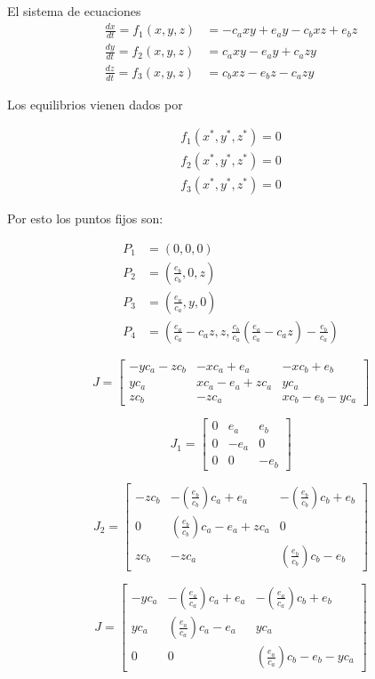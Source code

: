 \documentclass[twocolumn,aps,prl]{revtex4-1}
\begin{document}
El sistema de ecuaciones
$$
\begin{aligned}
\frac{d x}{d t} = f_1(x, y, z) &=-c_{a} x y+e_{a} y-c_{b} x z+e_{b} z \\
\frac{d y}{d t} = f_2(x, y, z) &=c_{a} x y-e_{a} y+c_{a} z y          \\
\frac{d z}{d t} = f_3(x, y, z) &=c_{b} x z-e_{b} z-c_{a} z y            
\end{aligned}
$$

Los equilibrios vienen dados por 

$$
\begin{aligned}
    f_1(x^*, y^*, z^*) = 0\\ 
    f_2(x^*, y^*, z^*) = 0\\ 
    f_3(x^*, y^*, z^*) = 0   
\end{aligned}
$$

Por esto los puntos fijos son:

$$
\begin{aligned}
    P_1 &= (0, 0, 0) \\ 
    P_2 &= (\frac{e_b}{c_b}, 0, z) \\ 
    P_3 &= (\frac{e_a}{c_a}, y, 0) \\ 
    P_4 &= (\frac{e_a}{c_a} - c_a z, z, \frac{c_b}{c_a} (\frac{e_a}{c_a} - c_a z) - \frac{e_b}{c_a}) 
\end{aligned}
$$


$$
J = 
\begin{bmatrix}  
    - y c_a - z c_b & - x c_a + e_a & - x c_b + e_b \\
    y c_a & x c_a - e_a + z c_a & y c_a \\
    z c_b & - z c_a & x c_b - e_b - y c_a 
\end{bmatrix}
$$

$$
J_1 = 
\begin{bmatrix}
    0 & e_a & e_b \\
    0 & - e_a & 0 \\
    0 & 0 & - e_b 
\end{bmatrix}
$$

$$
J_2 = 
\begin{bmatrix}  
    - z c_b & - (\frac{e_b}{c_b}) c_a + e_a & - (\frac{e_b}{c_b}) c_b + e_b \\
    0 & (\frac{e_b}{c_b}) c_a - e_a + z c_a & 0 \\
    z c_b & - z c_a & (\frac{e_b}{c_b}) c_b - e_b
\end{bmatrix}
$$


$$
J = 
\begin{bmatrix}  
    - y c_a & - (\frac{e_a}{c_a}) c_a + e_a & - (\frac{e_a}{c_a}) c_b + e_b \\
    y c_a & (\frac{e_a}{c_a}) c_a - e_a  & y c_a \\
    0 & 0 & (\frac{e_a}{c_a}) c_b - e_b - y c_a 
\end{bmatrix}
$$
\end{document}
